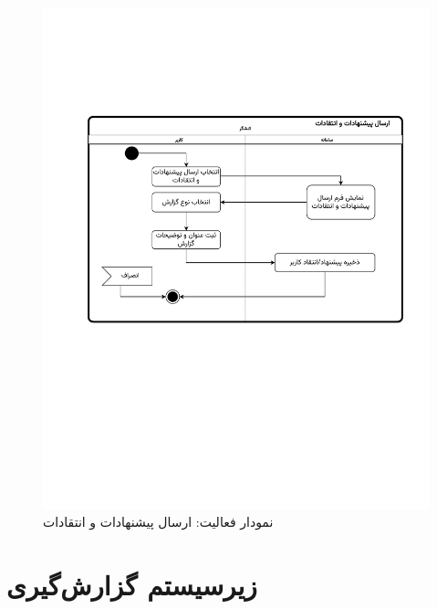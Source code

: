\begin{figure}[ht!]
	\centering
	\includegraphics[scale=0.8, page=1]{figs/OOD-activity-contactus.pdf}
	\caption{نمودار فعالیت: ارسال پیشنهادات و انتقادات}
\end{figure}
\FloatBarrier
\newpage


\section{زیرسیستم گزارش‌گیری}


